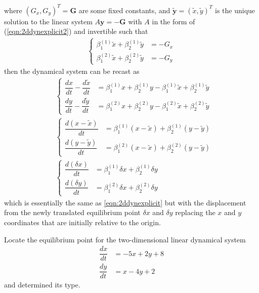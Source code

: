 where $(G_x, G_y)^T = \textbf{G}$ are some fixed constants, and $\tilde{\textbf{y}} = (\tilde{x}, \tilde{y})^T$ is the unique solution to the linear system $A\textbf{y} = -\textbf{G}$ with $A$ in the form of (\ref{eqn:2ddynexplicit2}) and invertible such that
\begin{align*}
\begin{cases}
\beta_1^{(1)} \tilde{x} + \beta_2^{(1)} \tilde{y} &= -G_x \\
\beta_1^{(2)} \tilde{x} + \beta_2^{(2)} \tilde{y} &= -G_y 
\end{cases}
\end{align*}
then the dynamical system can be recast as
\begin{align}
&\begin{cases}
\dfrac{dx}{dt} - \dfrac{d\tilde{x}}{dt} &= \beta_1^{(1)} x + \beta_2^{(1)} y - \beta_1^{(1)} \tilde{x} + \beta_2^{(1)} \tilde{y} \\[10pt]
\dfrac{dy}{dt} - \dfrac{d\tilde{y}}{dt} &= \beta_1^{(2)} x + \beta_2^{(2)} y - \beta_1^{(2)} \tilde{x} + \beta_2^{(2)} \tilde{y} 
\end{cases} \nonumber \\
&\begin{cases}
\dfrac{d(x-\tilde{x})}{dt} &= \beta_1^{(1)} (x-\tilde{x}) + \beta_2^{(1)} (y-\tilde{y}) \\[10pt]
\dfrac{d(y-\tilde{y})}{dt} &= \beta_1^{(2)} (x-\tilde{x}) + \beta_2^{(2)} (y-\tilde{y})
\end{cases} \\
&\begin{cases}
\dfrac{d(\delta x)}{dt} &= \beta_1^{(1)} \delta x + \beta_2^{(1)} \delta y \\[10pt]
\dfrac{d(\delta y)}{dt} &= \beta_1^{(2)} \delta x + \beta_2^{(2)} \delta y
\end{cases}
\label{eqn:2ddynfull}
\end{align}
which is essentially the same as \ref{eqn:2ddynexplicit} but with the displacement from the newly translated equilibrium point $\delta x$ and $\delta y$ replacing the $x$ and $y$ coordinates that are initially relative to the origin.
\begin{exmp}
Locate the equilibrium point for the two-dimensional linear dynamical system
\begin{align*}
\dfrac{dx}{dt} &= -5x + 2y + 8 \\[10pt]
\dfrac{dy}{dt} &= x - 4y + 2
\end{align*}
and determined its type.
\end{exmp}
